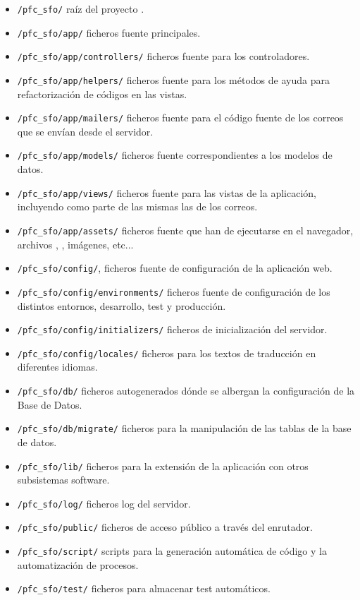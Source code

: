\begin{itemize}
\item \texttt{/pfc\_sfo/} raíz del proyecto .
\item \texttt{/pfc\_sfo/app/} ficheros fuente principales.
\item \texttt{/pfc\_sfo/app/controllers/} ficheros fuente para los
  controladores.
\item \texttt{/pfc\_sfo/app/helpers/} ficheros fuente para los métodos de ayuda
  para refactorización de códigos en las vistas.
\item \texttt{/pfc\_sfo/app/mailers/} ficheros fuente para el código fuente de
  los correos que se envían desde el servidor.
\item \texttt{/pfc\_sfo/app/models/} ficheros fuente correspondientes a los
  modelos de datos.
\item \texttt{/pfc\_sfo/app/views/} ficheros fuente para las vistas de la
  aplicación, incluyendo como parte de las mismas las de los correos.
\item \texttt{/pfc\_sfo/app/assets/} ficheros fuente que han de ejecutarse en el
  navegador, archivos , , imágenes, etc...
\item \texttt{/pfc\_sfo/config/}, ficheros fuente de configuración de la
  aplicación web.
\item \texttt{/pfc\_sfo/config/environments/} ficheros fuente de configuración
  de los distintos entornos, desarrollo, test y producción.
\item \texttt{/pfc\_sfo/config/initializers/} ficheros de inicialización del
  servidor.
\item \texttt{/pfc\_sfo/config/locales/} ficheros  para los textos
  de traducción en diferentes idiomas.
\item \texttt{/pfc\_sfo/db/} ficheros autogenerados dónde se albergan la
  configuración de la Base de Datos.
\item \texttt{/pfc\_sfo/db/migrate/} ficheros para la manipulación de las tablas
  de la base de datos.
\item \texttt{/pfc\_sfo/lib/} ficheros para la extensión de la aplicación con
  otros subsistemas software.
\item \texttt{/pfc\_sfo/log/} ficheros log del servidor.
\item \texttt{/pfc\_sfo/public/} ficheros de acceso público a través del
  enrutador.
\item \texttt{/pfc\_sfo/script/} scripts para la generación automática de código
  y la automatización de procesos.
\item \texttt{/pfc\_sfo/test/} ficheros para almacenar test automáticos.
\end{itemize}

